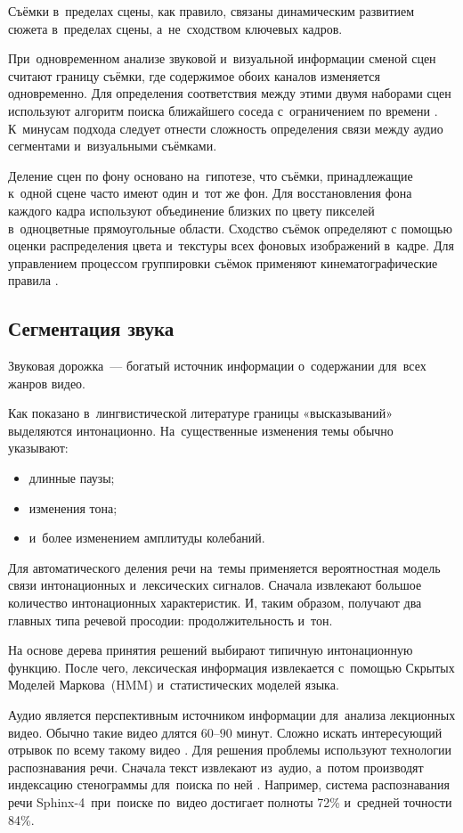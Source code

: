 Съёмки в~пределах сцены, как правило,
связаны динамическим развитием сюжета в~пределах сцены,
а~не~сходством ключевых кадров.


При~одновременном анализе звуковой и~визуальной информации сменой сцен считают
границу съёмки, где содержимое обоих каналов изменяется одновременно.
Для определения соответствия между этими двумя наборами сцен
используют алгоритм поиска ближайшего соседа
с~ограничением по времени \cite{Sundaram:2000}.
К~минусам подхода следует отнести сложность
определения связи между аудио сегментами и~визуальными съёмками.

Деление сцен по фону основано на~гипотезе, что съёмки,
принадлежащие к~одной сцене часто имеют один и~тот же фон.
Для восстановления фона каждого кадра используют объединение
близких по цвету пикселей в~одноцветные прямоугольные области.
Сходство съёмок определяют с помощью оценки распределения
цвета и~текстуры всех фоновых изображений в~кадре.
Для управлением процессом группировки съёмок
применяют кинематографические правила \cite{Chen:2008}.

\subsection{Сегментация звука}

Звуковая дорожка~— богатый источник информации
о~содержании для~всех жанров видео.

Как показано в~лингвистической литературе границы «высказываний»
выделяются интонационно.
На~существенные изменения темы обычно указывают:
\begin{itemize}
    \item длинные паузы;
    \item изменения тона;
    \item и~более изменением амплитуды колебаний.
\end{itemize}

Для автоматического деления речи на~темы
применяется вероятностная модель связи интонационных
и~лексических сигналов.
Сначала извлекают большое количество интонационных характеристик.
И, таким образом, получают два главных типа речевой просодии:
продолжительность и~тон.

На основе дерева принятия решений выбирают
типичную интонационную функцию.
После чего, лексическая информация извлекается
с~помощью Скрытых Моделей Маркова\
(HMM) и~статистических моделей языка.

Аудио является перспективным источником информации
для~анализа лекционных видео.
Обычно такие видео длятся $60 – 90$ минут.
Сложно искать интересующий отрывок по всему такому видео \cite{Repp:2008}.
Для решения проблемы используют технологии
распознавания речи.
Сначала текст извлекают из~аудио,
а~потом производят индексацию стенограммы для~поиска по ней \cite{Kumar:2011}.
Например, система распознавания речи Sphinx-4\index{Sphinx-4}\ при~поиске
по~видео достигает полноты 72\% и~средней точности 84\%.

